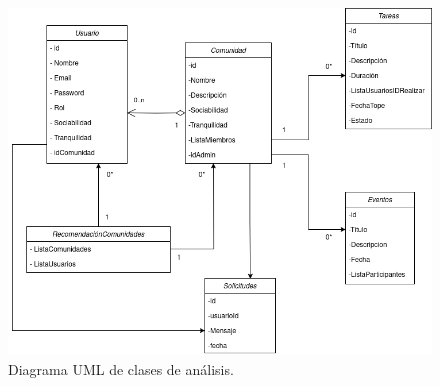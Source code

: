 \begin{figure}[H]
    \centering
    \includegraphics[width=\textwidth]{fotos/TFG1-Page-6.drawio(3).png}
    \caption{Diagrama UML de clases de análisis.}
\end{figure}
